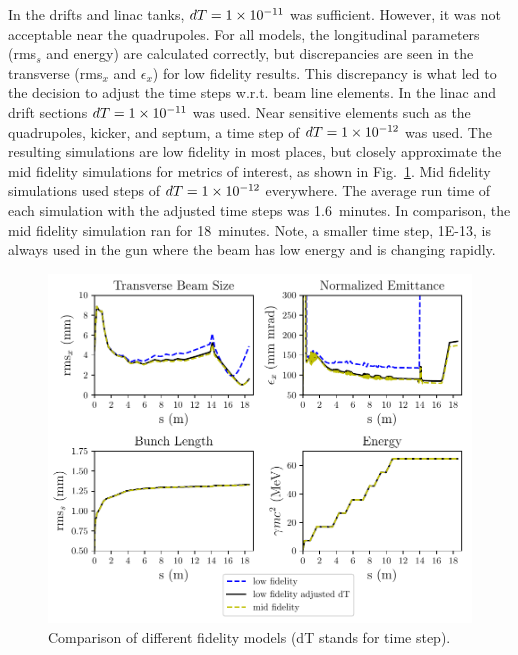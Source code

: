 In the drifts and linac tanks, $dT=\num{1E-11}$ was sufficient. 
However, it was not acceptable near the quadrupoles. 
For all models, the longitudinal parameters (rms$_s$ and energy) 
are calculated correctly, but discrepancies are seen in the transverse 
(rms$_x$ and $\epsilon_x$) for low fidelity results. This discrepancy is 
what led to the decision to adjust the time steps w.r.t. beam line elements. 
In the linac and drift sections $dT=\num{1E-11}$ was used. 
Near sensitive elements such as the quadrupoles, kicker, and septum, 
a time step of $dT=\num{1E-12}$ was used.
The resulting simulations are low fidelity in most places, but closely approximate 
the mid fidelity simulations for metrics of interest, as shown in 
Fig.~\ref{tstep}.  Mid fidelity simulations used steps of  $dT=\num{1E-12}$ everywhere.
The average run time of each simulation with the adjusted time steps was 1.6~minutes.
In comparison, the mid fidelity simulation ran for 18~minutes.
Note, a smaller time step, \num{1E-13}, is always used in the gun where the 
beam has low energy and is changing rapidly.
\begin{figure}
	\centering
	\includegraphics[width=0.8\linewidth]{timestep_comparison_paper}
	\caption{Comparison of different fidelity models (dT stands for time step).}
	\label{tstep}
\end{figure}

